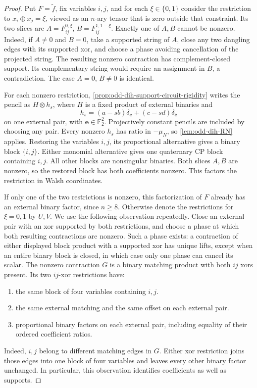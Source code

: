 \documentclass[11pt,letterpaper,onecolumn]{article}
\theoremstyle{plain}
\theoremstyle{definition}
\theoremstyle{remark}
\newcommand{\Ftwo}{\mathbb F_2}
\begin{document}
	\begin{proof}
		Put \(F=\widetilde f\), fix variables \(i,j\), and for each
		\(\xi\in\{0,1\}\) consider the restriction to \(x_i\oplus x_j=\xi\), viewed as an
		\(n\)-ary tensor that is zero outside that constraint.
		Its two slices are \(A=F_{ij}^{0,\xi}\), \(B=F_{ij}^{1,1-\xi}\).
		Exactly one of \(A,B\) cannot be nonzero.  Indeed, if \(A\ne0\) and \(B=0\), take a
		supported string of \(A\), close any two dangling edges with its supported
		xor, and choose a phase avoiding cancellation of the projected string.  The
		resulting nonzero contraction has complement-closed support.  Its
		complementary string would require an assignment in \(B\), a contradiction.
		The case \(A=0\), \(B\ne0\) is identical.
		
		For each nonzero restriction, \cref{prop:odd-dih-support-circuit-rigidity} writes
		the pencil as \(H\otimes h_s\), where \(H\) is a fixed product of external
		binaries and
		\[
		h_s=(a-sb)\delta_{\mathbf e}+(c-sd)\delta_{\bar {\mathbf e}}
		\]
		on one external pair, with \({\mathbf e}\in\Ftwo^2\).  Projectively constant pencils are included by
		choosing any pair.  Every nonzero \(h_s\) has ratio in \(-\mu_N\), so
		\cref{lem:odd-dih-RN} applies.  Restoring the variables \(i,j\), its
		proportional alternative gives a binary block \(\{i,j\}\). Either
		monomial alternative gives one quaternary CP block containing \(i,j\).
		All other blocks are nonsingular binaries.  Both slices \(A,B\) are
        nonzero, so the restored block has both coefficients nonzero.
        This factors the restriction in Walsh coordinates.
		
		If only one of the two restrictions is nonzero, this factorization of \(F\) already has an
		external binary factor, since \(n\ge8\).  Otherwise denote the restrictions for \(\xi=0,1\) by \(U,V\).  We use the following observation repeatedly.  Close
		an external pair with an xor supported by both restrictions, and choose a phase
		at which both resulting contractions are nonzero.  Such a phase exists: a contraction of
		either displayed block product with a supported xor has unique lifts, except when an entire
		binary block is closed, in which case only one phase can cancel its
		scalar.  The nonzero contraction \(G\) is a binary matching product with
		both \(ij\) xors present.  Its two \(ij\)-xor restrictions have:
		\begin{enumerate}[label=\textnormal{(O\arabic*)},leftmargin=*]
			\item the same block of four variables containing \(i,j\).
			\item the same external matching and the same offset on each external pair.
			\item proportional binary factors on each external pair, including
			equality of their ordered coefficient ratios.
		\end{enumerate}
		Indeed, \(i,j\) belong to different matching edges in \(G\).  Either xor
		restriction joins those edges into one block of four variables and leaves every
		other binary factor unchanged.  In particular, this observation identifies
		coefficients as well as supports.
		

\end{proof}
\end{document}

